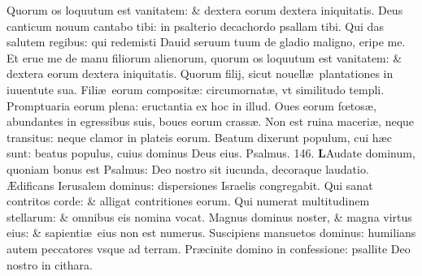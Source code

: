 \documentclass[a5paper,10pt]{book}
\def\ae{æ}
\def\AE{Æ}
\def\oe{œ}
\begin{document}
\begin{multicols*}{2}
\newline \color{red} Q\color{black}uorum os loquutum est vanitatem: \& dextera eorum dextera iniquitatis.
\newline \color{red} D\color{black}eus canticum nouum cantabo tibi: in psalterio decachordo psallam tibi.
\newline \color{red} Q\color{black}ui das salutem regibus: qui redemisti Dauid seruum tuum de gladio maligno, eripe me.
\newline \color{red} E\color{black}t erue me de manu filiorum alienorum, quorum os loquutum est vanitatem: \& dextera eorum dextera iniquitatis.
\newline \color{red} Q\color{black}uorum filij, sicut nouell\ae \ plantationes in iuuentute sua.
\newline \color{red} F\color{black}ili\ae \ eorum composit\ae : circumornat\ae , vt similitudo templi.
\newline \color{red} P\color{black}romptuaria eorum plena: eructantia ex hoc in illud.
\newline \color{red} O\color{black}ues eorum f\oe tos\ae , abundantes in egressibus suis, boues eorum crass\ae .
\newline \color{red} N\color{black}on est ruina maceri\ae , neque transitus: neque clamor in plateis eorum.
\newline \color{red} B\color{black}eatum dixerunt populum, cui h\ae c sunt: beatus populus, cuius dominus Deus eius. \quad \color{red} Psalmus. \hypertarget{ps146}{146.} \color{black}
\vspace{-.25em}
\lettrine[lines=2]{\bfseries \color{red} L}{}Audate dominum, quoniam bonus est Psalmus: Deo nostro sit iucunda, decoraque laudatio.
\newline \color{red} \AE\color{black}dificans Ierusalem dominus: dispersiones Israelis congregabit.
\newline \color{red} Q\color{black}ui sanat contritos corde: \& alligat contritiones eorum.
\newline \color{red} Q\color{black}ui numerat multitudinem stellarum: \& omnibus eis nomina vocat.
\newline \color{red} M\color{black}agnus dominus noster, \& magna virtus eius: \& sapienti\ae \ eius non est numerus.
\newline \color{red} S\color{black}uscipiens mansuetos dominus: humilians autem peccatores vsque ad terram.
\newline \color{red} P\color{black}r\ae cinite domino in confessione: psallite Deo nostro in cithara.

\end{multicols*}
\end{document}
